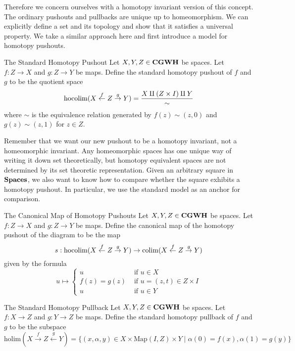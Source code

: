 \documentclass[a4paper]{article}
\begin{document}
Therefore we concern ourselves with a homotopy invariant version of this concept. The ordinary pushouts and pullbacks are unique up to homeomorphism. We can explicitly define a set and its topology and show that it satisfies a universal property. We take a similar approach here and first introduce a model for homotopy pushouts. 

\begin{defn}{The Standard Homotopy Pushout}{} Let $X,Y,Z\in\bold{CGWH}$ be spaces. Let $f:Z\to X$ and $g:Z\to Y$ be maps. Define the standard homotopy pushout of $f$ and $g$ to be the quotient space $$\operatorname*{hocolim}(X\overset{f}{\leftarrow}Z\overset{g}{\rightarrow}Y)=\frac{X\amalg(Z\times I)\amalg Y}{\sim}$$ where $\sim$ is the equivalence relation generated by $f(z)\sim (z,0)$ and $g(z)\sim(z,1)$ for $z\in Z$. 
\end{defn}

Remember that we want our new pushout to be a homotopy invariant, not a homeomorphic invariant. Any homeomorphic spaces has one unique way of writing it down set theoretically, but homotopy equivalent spaces are not determined by its set theoretic representation. Given an arbitrary square in $\bold{Spaces}$, we also want to know how to compare whether the square exhibits a homotopy pushout. In particular, we use the standard model as an anchor for comparison. 

\begin{defn}{The Canonical Map of Homotopy Pushouts}{} Let $X,Y,Z\in\bold{CGWH}$ be spaces. Let $f:Z\to X$ and $g:Z\to Y$ be maps. Define the canonical map of the homotopy pushout of the diagram to be the map $$s:\operatorname*{hocolim}(X\overset{f}{\leftarrow}Z\overset{g}{\rightarrow}Y)\to\operatorname*{colim}(X\overset{f}{\leftarrow}Z\overset{g}{\rightarrow}Y)$$ given by the formula $$u\mapsto\begin{cases}
u & \text{ if }u\in X\\
f(z)=g(z) & \text{ if }u=(z,t)\in Z\times I\\
u & \text{ if }u\in Y
\end{cases}$$
\end{defn}

\begin{defn}{The Standard Homotopy Pullback}{} Let $X,Y,Z\in\bold{CGWH}$ be spaces. Let $f:X\to Z$ and $g:Y\to Z$ be maps. Define the standard homotopy pullback of $f$ and $g$ to be the subspace $$\text{holim}(X\overset{f}{\rightarrow}Z\overset{g}{\leftarrow}Y)=\{(x,\alpha,y)\in X\times\text{Map}(I,Z)\times Y\;|\;\alpha(0)=f(x),\alpha(1)=g(y)\}$$
\end{defn}
\end{document}
